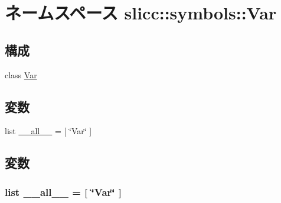 \hypertarget{namespaceslicc_1_1symbols_1_1Var}{
\section{ネームスペース slicc::symbols::Var}
\label{namespaceslicc_1_1symbols_1_1Var}
}
\subsection*{構成}
\begin{DoxyCompactItemize}
\item 
class \hyperlink{classslicc_1_1symbols_1_1Var_1_1Var}{Var}
\end{DoxyCompactItemize}
\subsection*{変数}
\begin{DoxyCompactItemize}
\item 
list \hyperlink{namespaceslicc_1_1symbols_1_1Var_aa4a022e6ddacd362b83964da5cc5d044}{\_\-\_\-all\_\-\_\-} = \mbox{[} \char`\"{}Var\char`\"{} \mbox{]}
\end{DoxyCompactItemize}


\subsection{変数}
\hypertarget{namespaceslicc_1_1symbols_1_1Var_aa4a022e6ddacd362b83964da5cc5d044}{
\subsubsection[{\_\-\_\-all\_\-\_\-}]{\setlength{\rightskip}{0pt plus 5cm}list {\bf \_\-\_\-all\_\-\_\-} = \mbox{[} \char`\"{}Var\char`\"{} \mbox{]}}}
\label{namespaceslicc_1_1symbols_1_1Var_aa4a022e6ddacd362b83964da5cc5d044}
